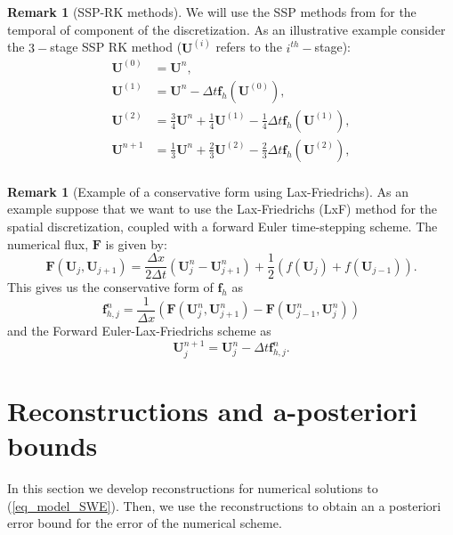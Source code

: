 \documentclass[12pt,a4paper]{article}
\numberwithin{equation}{section}
\theoremstyle{definition}
\newcommand{\vect}[1]{\textbf{#1}}
\newcommand{\qp}[1]{\left(#1\right)}
\newtheorem{Rem}[subsection]{Remark}
\begin{document}
\begin{Rem}[SSP-RK methods]
We will use the SSP methods  from \cite{shu1988total} for the temporal of component  of the discretization. As an illustrative example consider the $3-$stage SSP RK method ($\vect{U}^{\qp{i}}$ refers to the $i^{th}-$stage):
\begin{equation}\label{eq_SSP3_RK}
\begin{aligned}
\textbf{U}^{\qp{0}}&=\textbf{U}^n,\\
\textbf{U}^{\qp{1}}&=\textbf{U}^n-\Delta t \vect{f}_h\qp{\textbf{U}^{\qp{0}}},\\
\textbf{U}^{\qp{2}}&=\frac{3}{4}\textbf{U}^n +\frac{1}{4}\textbf{U}^{\qp{1}} -\frac{1}{4}\Delta t \vect{f}_h\qp{\textbf{U}^{\qp{1}}},\\
\textbf{U}^{n+1}&=\frac{1}{3}\textbf{U}^n +\frac{2}{3}\textbf{U}^{\qp{2}} -\frac{2}{3}\Delta t \vect{f}_h\qp{\textbf{U}^{\qp{2}}},\\
\end{aligned}
\end{equation}
\end{Rem}

\begin{Rem}[Example of a conservative form using Lax-Friedrichs]
	As an example suppose that we want to use the Lax-Friedrichs (LxF) method for the spatial discretization, coupled with a forward Euler time-stepping scheme. The numerical flux, $\vect{F}$ is given by:
	\begin{equation}\label{eq_F_Lxf_conservative}
	\vect{F}\qp{\vect{U}_j, \vect{U}_{j+1}}=\frac{\Delta x}{2\Delta t}\qp{\vect{U}^n_j-\vect{U}^n_{j+1}}+\frac{1 }{2}\qp{f\qp{\vect{U}_{j}}+f\qp{\vect{U}_{j-1}}}.
	\end{equation}
	This gives us the conservative form of $\vect{f}_h$ as
	\begin{equation}
	\vect{f}^n_{h,j}= \frac{1}{\Delta x}\qp{\vect{F}\qp{\vect{U}^n_j, \vect{U}^n_{j+1}}-\vect{F}\qp{\vect{U}^n_{j-1}, \vect{U}^n_{j}}}
	\end{equation}
	and the Forward Euler-Lax-Friedrichs scheme as 
	\begin{equation}
	\vect{U}^{n+1}_j=\vect{U}^n_j-\Delta t\vect{f}^n_{h,j}.
	\end{equation}
\end{Rem}

\section{Reconstructions and a-posteriori bounds}\label{sec_bounds}
In this section we develop reconstructions for numerical solutions to (\ref{eq_model_SWE}).  Then, we use the reconstructions to obtain an a posteriori error bound for the error of the numerical scheme.  
\end{document}
